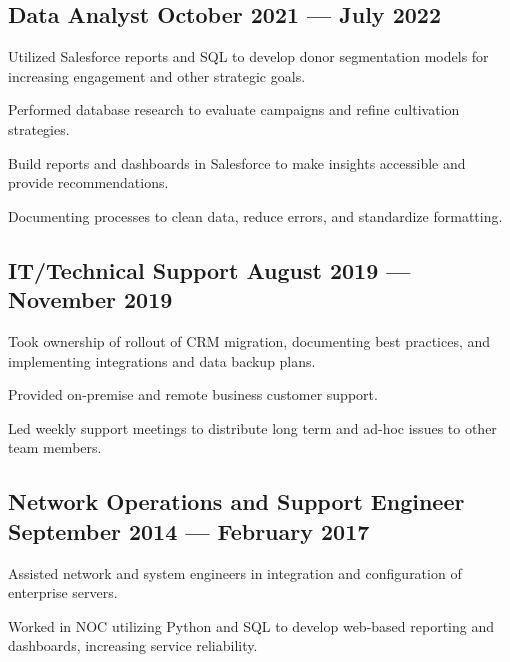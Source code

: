 \subsection{{Data Analyst \hfill October 2021 --- July 2022}}
\begin{zitemize}
\item Utilized Salesforce reports and SQL to develop donor segmentation models for increasing engagement and other strategic goals.
\item Performed database research to evaluate campaigns and refine cultivation strategies.
\item Build reports and dashboards in Salesforce to make insights accessible and provide recommendations.
\item Documenting processes to clean data, reduce errors, and standardize formatting.
\end{zitemize}

\subsection{{IT/Technical Support \hfill August 2019 --- November 2019}}
\begin{zitemize}
\item Took ownership of rollout of CRM migration, documenting best practices, and implementing integrations and data backup plans.
\item Provided on-premise and remote business customer support.
\item Led weekly support meetings to distribute long term and ad-hoc issues to other team members.
\end{zitemize}

\subsection{{Network Operations and Support Engineer  \hfill September 2014 --- February 2017}}
\begin{zitemize}
\item Assisted network and system engineers in integration and configuration of enterprise servers.
\item Worked in NOC utilizing Python and SQL to develop web-based reporting and dashboards, increasing service reliability.
\end{zitemize}

